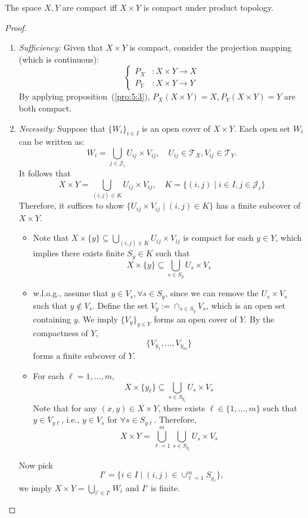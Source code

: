 \begin{theorem}
The space $X,Y$ are compact iff $X\times Y$ is compact under product topology.
\end{theorem}
\begin{proof}
\begin{enumerate}
\item
\textit{Sufficiency:}
Given that $X\times Y$ is compact, consider the projection mapping (which is continuous):
\[
\left\{
\begin{aligned}
P_X&:X\times Y\to X\\
P_Y&:X\times Y\to Y
\end{aligned}
\right.
\]
By applying proposition~(\ref{pro:5:3}), $P_X(X\times Y)=X,P_Y(X\times Y)=Y$ are both compact.
\item
\textit{Necessity:}
Suppose that $\{W_i\}_{i\in I}$ is an open cover of $X\times Y$. Each open set $W_i$ can be written as:
\[
W_i = \bigcup_{j\in\mathcal{J}_i}U_{ij}\times V_{ij},\quad
U_{ij}\in\mathcal{T}_X,V_{ij}\in\mathcal{T}_Y.
\]
It follows that 
\[
X\times Y = \bigcup_{(i,j)\in K}U_{ij}\times V_{ij},\quad
K=\{(i,j)\mid i\in I, j\in\mathcal{J}_i\}
\]
Therefore, it suffices to show $\{U_{ij}\times V_{ij}\mid (i,j)\in K\}$ has a finite subcover of $X\times Y$.
\begin{itemize}
\item
Note that $X\times\{y\}\subseteq\bigcup_{(i,j)\in K}U_{ij}\times V_{ij}$ is compact for each $y\in Y$, which implies there exists finite $S_y\in K$ such that 
\[
X\times\{y\}\subseteq\bigcup_{s\in S_y}U_{s}\times V_{s}
\]
\item
w.l.o.g., assume that $y\in V_s,\forall s\in S_y$, since we can remove the $U_s\times V_s$ such that $y\notin V_s$.
Define the set $V_y:=\cap_{s\in S_y}V_s$, which is an open set containing $y$. We imply $\{V_y\}_{y\in Y}$ forms an open cover of $Y$.
By the compactness of $Y$, 
\[
\{V_{y_1},\dots,V_{y_m}\}
\]
forms a finite subcover of $Y$.
\item
For each $\ell=1,\dots,m$,
\[
X\times \{y_\ell\}\subseteq 
\bigcup_{s\in S_{y_\ell}}U_s\times V_s
\]
Note that for any $(x,y)\in X\times Y$, there exists $\ell\in\{1,\dots,m\}$ such that $y\in V_{y\ell}$, i.e., $y\in V_s$ for $\forall s\in S_{y\ell}$.
Therefore,
\[
X\times Y = \bigcup_{\ell=1}^m\bigcup_{s\in S_{y_\ell}}U_s\times V_s
\]
\end{itemize}
Now pick
\[
I'=\{i\in I\mid (i,j)\in\cup_{\ell=1}^m S_{y_\ell}\},
\]
we imply $X\times Y = \bigcup_{i'\in I'}W_i$ and $I'$ is finite.
\end{enumerate}
\end{proof}
